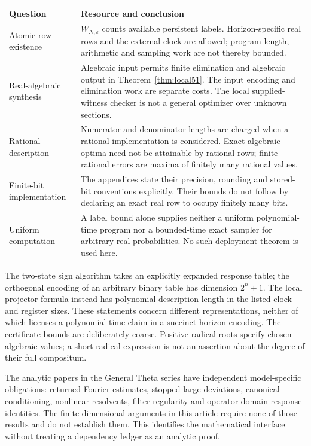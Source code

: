 \begin{center}
\small
\begin{tabular}{@{}p{.22\linewidth}p{.72\linewidth}@{}}
\toprule
Question & Resource and conclusion \\
\midrule
Atomic-row existence & $W_{N,\varepsilon}$ counts available persistent
labels. Horizon-specific real rows and the external clock are allowed;
program length, arithmetic and sampling work are not thereby bounded.\\[4pt]
Real-algebraic synthesis & Algebraic input permits finite elimination
and algebraic output in Theorem~\ref{thm:local51}. The input encoding
and elimination work are separate costs. The local supplied-witness
checker is not a general optimizer over unknown sections.\\[4pt]
Rational description & Numerator and denominator lengths are charged
when a rational implementation is considered. Exact algebraic optima
need not be attainable by rational rows; finite rational errors are
maxima of finitely many rational values.\\[4pt]
Finite-bit implementation & The appendices state their precision,
rounding and stored-bit conventions explicitly. Their bounds do not
follow by declaring an exact real row to occupy finitely many bits.\\[4pt]
Uniform computation & A label bound alone supplies neither a uniform
polynomial-time program nor a bounded-time exact sampler for arbitrary
real probabilities. No such deployment theorem is used here.\\
\bottomrule
\end{tabular}
\end{center}

The two-state sign algorithm takes an explicitly expanded response
table; the orthogonal encoding of an arbitrary binary table has
dimension $2^n+1$. The local projector formula instead has polynomial
description length in the listed clock and register sizes. These
statements concern different representations, neither of which
licenses a polynomial-time claim in a succinct horizon encoding.
The certificate bounds are deliberately coarse. Positive radical
roots specify chosen algebraic values; a short radical expression is
not an assertion about the degree of their full compositum.

The analytic papers in the General Theta series have independent
model-specific obligations: returned Fourier estimates, stopped
large deviations, canonical conditioning, nonlinear resolvents,
filter regularity and operator-domain response identities. The
finite-dimensional arguments in this article require none of those
results and do not establish them. This identifies the mathematical
interface without treating a dependency ledger as an analytic proof.
